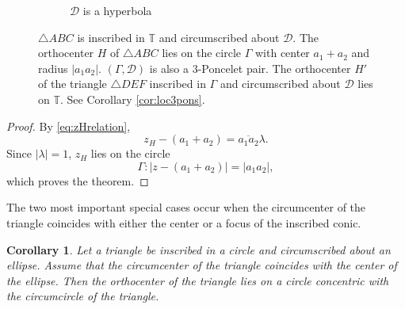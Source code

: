 \documentclass[11pt,reqno]{amsart}
\newtheorem{corollary}{Corollary}[section]
\theoremstyle{definition}
\numberwithin{equation}{section}
\begin{document}
\begin{figure}
\begin{subfigure}[b]{0.45\textwidth}
    \caption{$\mathcal D$ is a hyperbola}
    \label{fig:orthcirc(B)}
    \end{subfigure}
        \caption{$\triangle ABC$ is inscribed in $\mathbb T$ and circumscribed about $\mathcal D$. The orthocenter $H$ of $\triangle ABC$ lies on the circle $\Gamma$ with center $a_1+a_2$ and radius $|a_1a_2|$. $(\Gamma,\mathcal D)$ is also a 3-Poncelet pair. The orthocenter $H'$ of the triangle $\triangle DEF$ inscribed in $\Gamma$ and circumscribed about $\mathcal D$ lies on $\mathbb T$. See Corollary \ref{cor:loc3pons}.}
    \label{fig:orthcirc}
\end{figure}

\begin{proof}
By \eqref{eq:zHrelation},
\[
z_H-(a_1+a_2)=\overline{a_1a_2}\lambda.
\]
Since $|\lambda|=1$, $z_H$ lies on the circle
\[
\Gamma: |z-(a_1+a_2)|=|a_1a_2|,
\]
which proves the theorem.
\end{proof}

The two most important special cases occur when the circumcenter of the triangle
coincides with either the center or a focus of the inscribed conic.

\begin{corollary}\label{cor:orthcirccen}
Let a triangle be inscribed in a circle and circumscribed about an ellipse. Assume that the circumcenter of the triangle coincides with the center of the ellipse. Then the orthocenter of the triangle lies on a circle concentric with the circumcircle of the triangle.
\end{corollary}
\end{document}
